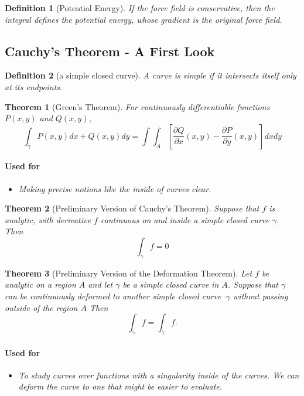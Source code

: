 \documentclass[a4paper]{article}
\newtheorem{definition}{Definition}
\newtheorem{theorem}{Theorem}
\begin{document}
\begin{definition}[Potential Energy]
  If the force field is conservative, then the integral defines the potential energy, whose gradient is the original force field. 
\end{definition}

\subsection{Cauchy's Theorem - A First Look}
\begin{definition}[a simple closed curve]
  A curve is simple if it intersects itself only at its endpoints. 
\end{definition}

\begin{theorem}[Green's Theorem]
  For continuously differentiable functions \(P(x, y)\) and \(Q(x, y)\), 
  \[
    \int_\gamma P(x, y) dx + Q(x, y) dy = \int \int_A [\frac{\partial Q}{\partial x}(x, y) - \frac{\partial P}{\partial y}(x, y)] dx dy
    \]
  \paragraph{Used for}
    \begin{itemize}
      \item Making precise notions like the inside of curves clear. 
    \end{itemize}
\end{theorem}

\begin{theorem}[Preliminary Version of Cauchy's Theorem]
  Suppose that \(f\) is analytic, with derivative \(f\) continuous on and inside a simple closed curve \(\gamma\). 
  Then
  \[
    \int_\gamma f = 0
    \]
\end{theorem}

\begin{theorem}[Preliminary Version of the Deformation Theorem]
  Let \(f\) be analytic on a region \(A\) and let \(\gamma\) be a simple closed curve in \(A\). 
  Suppose that \(\gamma\) can be continuously deformed to another simple closed curve \(\bar{}\gamma\) without passing outside of the region \(A\) Then
  \[
    \int_\gamma f = \int_{\bar{\gamma}} f.
  \]
  \paragraph{Used for}
    \begin{itemize}
      \item To study curves over functions with a singularity inside of the curves.
       We can deform the curve to one that might be easier to evaluate. 
    \end{itemize}
\end{theorem}
\end{document}
